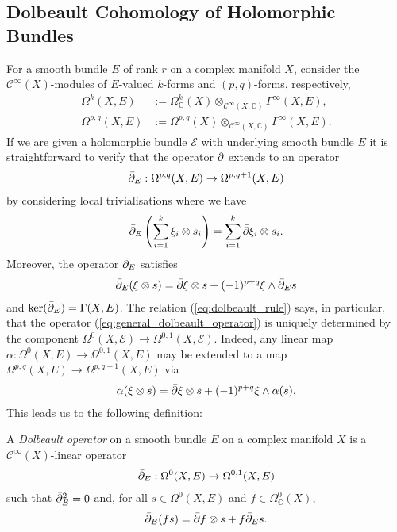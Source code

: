 \documentclass[12pt]{ociamthesis}  %
\begin{document}
\subsection{Dolbeault Cohomology of Holomorphic Bundles}

For a smooth bundle $E$ of rank $r$ on a complex manifold $X$,
consider the $\mathscr C^\infty(X)$-modules of $E$-valued $k$-forms and $(p,q)$-forms,
respectively,
\begin{align*}
  \Omega^k(X,E)     & := \Omega^k_{\mathbb C}(X)\otimes_{\mathscr C^\infty(X,\mathbb C)}\Gamma^\infty(X,E), \\
  \Omega^{p,q}(X,E) & := \Omega^{p,q}(X)\otimes_{\mathscr C^\infty(X,\mathbb C)}\Gamma^\infty(X,E).
\end{align*}
If we are given a holomorphic bundle $\mathcal E$ with underlying
smooth bundle $E$
it is straightforward to verify that the operator ${\bar{\partial}}$ extends
to an operator
\begin{align}\label{eq:general_dolbeault_operator}
  {\bar{\partial}}_E : \Omega^{p,q}(X,E) \to \Omega^{p,q+1}(X,E)
\end{align}
by considering local trivialisations where we have
\begin{align*}
  {\bar{\partial}}_E \left({\sum_{i=1}^k \xi_i \otimes s_i}\right)
  = \sum_{i=1}^k {\bar{\partial}} \xi_i \otimes s_i.
\end{align*}
Moreover, the operator ${\bar{\partial}}_E$ satisfies
\begin{align}\label{eq:dolbeault_rule}
  {\bar{\partial}}_E(\xi \otimes s) = {\bar{\partial}}\xi \otimes s + (-1)^{p+q} \xi \wedge {\bar{\partial}}_E s
\end{align}
and $\ker({\bar{\partial}}_E) = \Gamma(X,E)$.
The relation (\ref{eq:dolbeault_rule}) says, in particular, that
the operator (\ref{eq:general_dolbeault_operator}) is uniquely
determined by the component
$\Omega^0(X,\mathcal E) \to \Omega^{0,1}(X,\mathcal E)$. Indeed,
any linear map $\alpha : \Omega^0(X,E) \to \Omega^{0,1}(X,E)$ may be
extended to a map $\Omega^{p,q}(X,E) \to \Omega^{p,q+1}(X,E)$
via
\begin{align}\label{eq:leibniz_extension}
  \alpha(\xi \otimes s) = {\bar{\partial}}\xi \otimes s + (-1)^{p+q}\xi\wedge \alpha(s).
\end{align}
This leads us to the following definition:

\begin{definition}
  A \emph{Dolbeault operator} on a smooth bundle $E$ on a complex
  manifold $X$ is a $\mathscr C^\infty(X)$-linear operator
  \begin{align*}
    {\bar{\partial}}_E : \Omega^0(X,E) \to \Omega^{0,1}(X,E)
  \end{align*}
  such that ${\bar{\partial}}_E^2 = 0$ and, for all $s\in\Omega^0(X,E)$ and
  $f\in \Omega^0_{\mathbb C}(X)$,
  \begin{align*}
    {\bar{\partial}}_E (fs) = {\bar{\partial}} f\otimes s + f {\bar{\partial}}_E s.
  \end{align*}
\end{definition}
\end{document}
